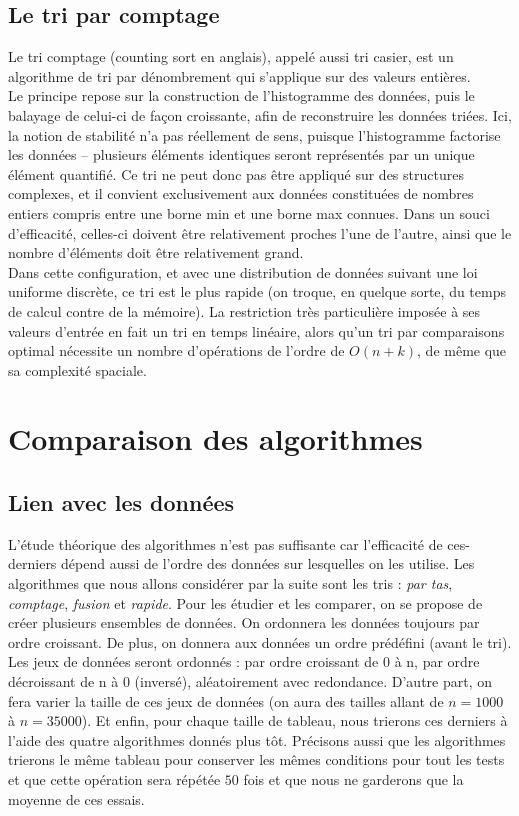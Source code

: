 \documentclass[11pt,a4paper]{article}
\begin{document}
\subsection{Le tri par comptage}
Le tri comptage (counting sort en anglais), appelé aussi tri casier, est un algorithme de tri par dénombrement qui s'applique sur des valeurs entières.\\
Le principe repose sur la construction de l'histogramme des données, puis le balayage de celui-ci de façon croissante, afin de reconstruire les données triées.
Ici, la notion de stabilité n'a pas réellement de sens, puisque l'histogramme factorise les données – plusieurs éléments identiques seront représentés par un unique
élément quantifié. Ce tri ne peut donc pas être appliqué sur des structures complexes, et il convient exclusivement aux données constituées de nombres entiers
compris entre une borne min et une borne max connues. Dans un souci d'efficacité, celles-ci doivent être relativement proches l'une de l'autre, ainsi que le nombre
d'éléments doit être relativement grand.\\
Dans cette configuration, et avec une distribution de données suivant une loi uniforme discrète, ce tri est le plus rapide (on troque, en quelque sorte, du temps de
calcul contre de la mémoire). La restriction très particulière imposée à ses valeurs d'entrée en fait un tri en temps linéaire, alors qu'un tri par comparaisons
optimal nécessite un nombre d'opérations de l'ordre de $\displaystyle{O(n+k)}$, de même que sa complexité spaciale.

\section{Comparaison des algorithmes}
\subsection{Lien avec les données}
L’étude théorique des algorithmes n’est pas suffisante car l’efficacité de ces-derniers dépend
aussi de l’ordre des données sur lesquelles on les utilise. Les algorithmes que nous allons considérer
par la suite sont les tris : \textit{par tas}, \textit{comptage}, \textit{fusion} et \textit{rapide}.
Pour les étudier et les comparer, on se propose de créer plusieurs ensembles de données.
On ordonnera les données toujours par ordre croissant. De plus, on donnera aux données un
ordre prédéfini (avant le tri). Les jeux de données seront ordonnés : par ordre croissant de 0 à n,
par ordre décroissant de n à 0 (inversé), aléatoirement
avec redondance. D’autre part, on fera varier la taille de ces jeux de données (on
aura des tailles allant de $n = 1000$ à $n = 35000$). Et enfin, pour chaque taille de tableau, nous trierons ces derniers
à l'aide des quatre algorithmes donnés plus tôt. Précisons aussi que les algorithmes trierons le même tableau pour conserver les
mêmes conditions pour tout les tests et que cette opération sera répétée $50$ fois et que nous ne garderons que la moyenne de ces essais.
\end{document}
